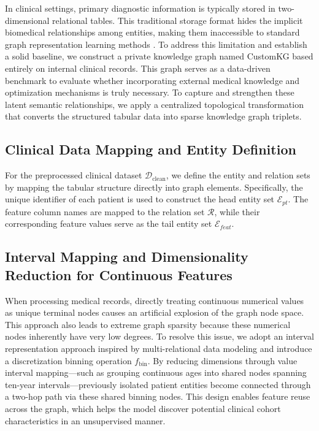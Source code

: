 \documentclass[sn-mathphys-num]{sn-jnl}%
\theoremstyle{thmstyleone}%
\theoremstyle{thmstyletwo}%
\theoremstyle{thmstylethree}%
\begin{document}
In clinical settings, primary diagnostic information is typically stored in two-dimensional relational tables. This traditional storage format hides the implicit biomedical relationships among entities, making them inaccessible to standard graph representation learning methods \cite{Rotmensch2017}. To address this limitation and establish a solid baseline, we construct a private knowledge graph named CustomKG based entirely on internal clinical records. This graph serves as a data-driven benchmark to evaluate whether incorporating external medical knowledge and optimization mechanisms is truly necessary. To capture and strengthen these latent semantic relationships, we apply a centralized topological transformation that converts the structured tabular data into sparse knowledge graph triplets.

\subsection{Clinical Data Mapping and Entity Definition}
For the preprocessed clinical dataset $\mathcal{D}_{\mathrm{clean}}$, we define the entity and relation sets by mapping the tabular structure directly into graph elements. Specifically, the unique identifier of each patient is used to construct the head entity set $\mathcal{E}_{pt}$. The feature column names are mapped to the relation set $\mathcal{R}$, while their corresponding feature values serve as the tail entity set $\mathcal{E}_{feat}$.

\subsection{Interval Mapping and Dimensionality Reduction for Continuous Features}
When processing medical records, directly treating continuous numerical values as unique terminal nodes causes an artificial explosion of the graph node space. This approach also leads to extreme graph sparsity because these numerical nodes inherently have very low degrees. To resolve this issue, we adopt an interval representation approach inspired by multi-relational data modeling \cite{bordes2013transe} and introduce a discretization binning operation $f_{\mathrm{bin}}$. By reducing dimensions through value interval mapping—such as grouping continuous ages into shared nodes spanning ten-year intervals—previously isolated patient entities become connected through a two-hop path via these shared binning nodes. This design enables feature reuse across the graph, which helps the model discover potential clinical cohort characteristics in an unsupervised manner.
\end{document}
